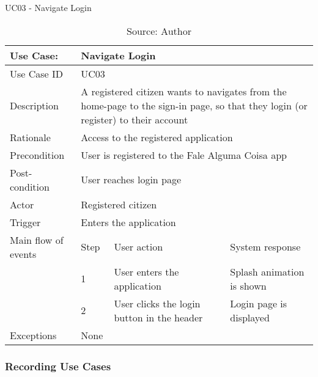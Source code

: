 \begin{table}[h]
\centering
\caption{UC03 - Navigate Login}
\label{uc:03}
\begin{tabular}{|p{3cm}|p{1cm}|p{5cm}|p{5cm}|}
\hline
Use Case:       & \multicolumn{3}{p{11cm}|}{Navigate Login} \\ \hline
Use Case ID     & \multicolumn{3}{p{11cm}|}{UC03} \\ \hline
Description     & \multicolumn{3}{p{11cm}|}{A registered citizen wants to navigates from the home-page to the sign-in page, so that they login (or register) to their account} \\ \hline
Rationale       & \multicolumn{3}{p{11cm}|}{Access to the registered application} \\ \hline
Precondition    & \multicolumn{3}{p{11cm}|}{User is registered to the Fale Alguma Coisa app} \\ \hline
Post-condition  & \multicolumn{3}{p{11cm}|}{User reaches login page} \\ \hline
Actor           & \multicolumn{3}{p{11cm}|}{Registered citizen} \\ \hline
Trigger         & \multicolumn{3}{p{11cm}|}{Enters the application} \\ \hline
Main flow of events & Step  & User action & System response \\ \hline
                    & 1     & User enters the application & Splash animation is shown \\ \hline
                    & 2     & User clicks the login button in the header & Login page is displayed \\ \hline
Exceptions      & \multicolumn{3}{p{11cm}|}{None} \\ \hline
\end{tabular}
\caption*{Source: Author}
\end{table}

\clearpage
\subsubsection{Recording Use Cases}

